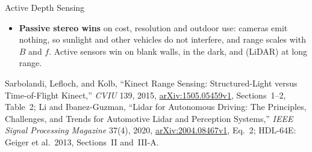 \begin{frame}{Active Depth Sensing}
\begin{itemize}
    \item \textbf{Passive stereo wins} on cost, resolution and outdoor use: cameras emit nothing, so sunlight and other vehicles do not interfere, and range scales with $B$ and $f$. Active sensors win on blank walls, in the dark, and (LiDAR) at long range.
  \end{itemize}
  {\scriptsize Sarbolandi, Lefloch, and Kolb, ``Kinect Range Sensing: Structured-Light versus Time-of-Flight Kinect,'' \textit{CVIU} 139, 2015, \href{https://arxiv.org/abs/1505.05459v1}{arXiv:1505.05459v1}, Sections~1--2, Table~2; Li and Ibanez-Guzman, ``Lidar for Autonomous Driving: The Principles, Challenges, and Trends for Automotive Lidar and Perception Systems,'' \textit{IEEE Signal Processing Magazine} 37(4), 2020, \href{https://arxiv.org/abs/2004.08467v1}{arXiv:2004.08467v1}, Eq.~2; HDL-64E: Geiger et al.\ 2013, Sections~II and~III-A.\par}
\end{frame}
